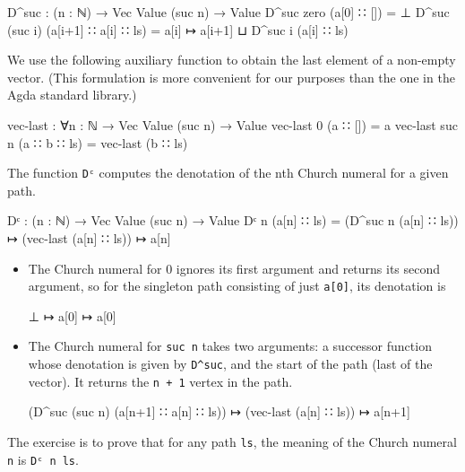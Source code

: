 \begin{fence}
\begin{code}
D^suc : (n : ℕ) → Vec Value (suc n) → Value
D^suc zero (a[0] ∷ []) = ⊥
D^suc (suc i) (a[i+1] ∷ a[i] ∷ ls) =  a[i] ↦ a[i+1]  ⊔  D^suc i (a[i] ∷ ls)
\end{code}
\end{fence}

We use the following auxiliary function to obtain the last element of a
non-empty vector. (This formulation is more convenient for our purposes
than the one in the Agda standard library.)

\begin{fence}
\begin{code}
vec-last : ∀{n : ℕ} → Vec Value (suc n) → Value
vec-last {0} (a ∷ []) = a
vec-last {suc n} (a ∷ b ∷ ls) = vec-last (b ∷ ls)
\end{code}
\end{fence}

The function \texttt{Dᶜ} computes the denotation of the nth Church
numeral for a given path.

\begin{fence}
\begin{code}
Dᶜ : (n : ℕ) → Vec Value (suc n) → Value
Dᶜ n (a[n] ∷ ls) = (D^suc n (a[n] ∷ ls)) ↦ (vec-last (a[n] ∷ ls)) ↦ a[n]
\end{code}
\end{fence}

\begin{itemize}
\item
  The Church numeral for 0 ignores its first argument and returns its
  second argument, so for the singleton path consisting of just
  \texttt{a{[}0{]}}, its denotation is

  \begin{myDisplay}
    ⊥ ↦ a[0] ↦ a[0]
  \end{myDisplay}
\item
  The Church numeral for \texttt{suc\ n} takes two arguments: a
  successor function whose denotation is given by \texttt{D\^{}suc}, and
  the start of the path (last of the vector). It returns the
  \texttt{n\ +\ 1} vertex in the path.

  \begin{myDisplay}
    (D^suc (suc n) (a[n+1] ∷ a[n] ∷ ls)) ↦ (vec-last (a[n] ∷ ls)) ↦ a[n+1]
  \end{myDisplay}
\end{itemize}

The exercise is to prove that for any path \texttt{ls}, the meaning of
the Church numeral \texttt{n} is \texttt{Dᶜ\ n\ ls}.

